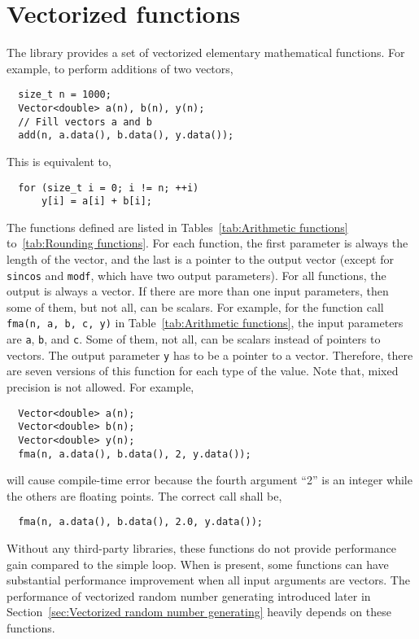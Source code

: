\section{Vectorized functions}
\label{sec:Vectorized functions}

The library provides a set of vectorized elementary mathematical functions.
For example, to perform additions of two vectors,
\begin{Verbatim}
  size_t n = 1000;
  Vector<double> a(n), b(n), y(n);
  // Fill vectors a and b
  add(n, a.data(), b.data(), y.data());
\end{Verbatim}
This is equivalent to,
\begin{Verbatim}
  for (size_t i = 0; i != n; ++i)
      y[i] = a[i] + b[i];
\end{Verbatim}
The functions defined are listed in Tables~\ref{tab:Arithmetic functions}
to~\ref{tab:Rounding functions}. For each function, the first parameter is
always the length of the vector, and the last is a pointer to the output vector
(except for \verb|sincos| and \verb|modf|, which have two output parameters).
For all functions, the output is always a vector. If there are more than one
input parameters, then some of them, but not all, can be scalars. For example,
for the function call \verb|fma(n, a, b, c, y)| in Table~\ref{tab:Arithmetic
  functions}, the input parameters are \verb|a|, \verb|b|, and \verb|c|. Some
of them, not all, can be scalars instead of pointers to vectors. The output
parameter \verb|y| has to be a pointer to a vector. Therefore, there are seven
versions of this function for each type of the value. Note that, mixed
precision is not allowed. For example,
\begin{Verbatim}
  Vector<double> a(n);
  Vector<double> b(n);
  Vector<double> y(n);
  fma(n, a.data(), b.data(), 2, y.data());
\end{Verbatim}
will cause compile-time error because the fourth argument ``2'' is an integer
while the others are floating points. The correct call shall be,
\begin{Verbatim}
  fma(n, a.data(), b.data(), 2.0, y.data());
\end{Verbatim}
Without any third-party libraries, these functions do not provide performance
gain compared to the simple loop. When \mkl is present, some functions can have
substantial performance improvement when all input arguments are vectors. The
performance of vectorized random number generating introduced later in
Section~\ref{sec:Vectorized random number generating} heavily depends on these
functions.


